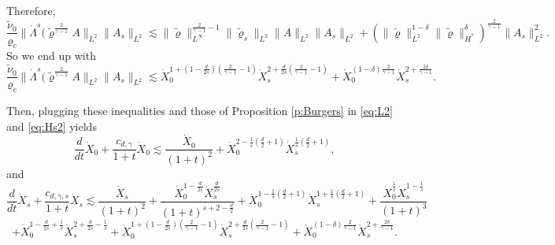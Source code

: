 \documentclass[11pt,twoside]{amsart}
\newcommand{\tildrho}{\tilde{\varrho}}
\begin{document}
Therefore,
$$
\frac{\tilde \nu_0}{\varrho_c}\|\dot\Lambda^s(\tildrho^{\frac{2}{\gamma-1}} A\|_{L^2}\|A_s\|_{L^2}
\lesssim
\|\tildrho\|_{L^\infty}^{\frac{2}{\gamma-1}-1} \|\tildrho_s\|_{L^2}
\|A\|_{L^2}\|A_s\|_{L^2}
+\left( \|\tildrho\|_{L^2}^{1-\delta}\| \tildrho \|_{\dot H^s}^{\delta}
\right)^{\frac{2}{\gamma-1}}
\|A_s\|_{L^2}^2.
$$
So we end up  with
$$
\frac{\tilde \nu_0}{\varrho_c}\|\dot\Lambda^s(\tildrho^{\frac{2}{\gamma-1}} A\|_{L^2}\|A_s\|_{L^2}
\lesssim
\dot X_0^{1+(1-\frac{d}{2s})(\frac{2}{\gamma-1}-1)}
\dot X_s^{2+\frac{d}{2s}(\frac{2}{\gamma-1}-1)}
+
\dot X_0^{(1-\delta)\frac{2}{\gamma-1}}
\dot X_s^{2+\frac{2\delta}{\gamma-1}}.
$$

Then, plugging these inequalities and those of Proposition \ref{p:Burgers} in \eqref{eq:L2} and \eqref{eq:Hs2} yields
$$
\frac d{dt}\dot X_0+\frac{c_{d,\gamma}}{1+t}\dot X_0\lesssim \frac{\dot X_0}{(1+t)^2}+\dot X_0^{2-\frac1s(\frac d2+1)}\dot X_s^{\frac1s(\frac d2+1)},
$$
and
$$
\frac d{dt}\dot X_s+\frac{c_{d,\gamma,s}}{1+t}\dot X_s\lesssim \frac{\dot X_s}{(1+t)^2}+\frac{\dot X_0^{1-\frac d{2s}}\dot X_s^{\frac d{2s}}}{(1+t)^{s+2-\frac d2}}
+\dot X_0^{1-\frac 1s(\frac d2+1)}\dot X_s^{1+\frac1s(\frac d2+1)}+\frac{\dot X_0^{\frac1s}\dot X_s^{1-\frac1s}}{(1+t)^3}
$$
$$
+\dot X_0^{1-\frac{d}{2s}+\frac{1}{s}}
\dot X_s^{2+\frac{d}{2s}-\frac{1}{s}}
+
\dot X_0^{1+(1-\frac{d}{2s})(\frac{2}{\gamma-1}-1)}
\dot X_s^{2+\frac{d}{2s}(\frac{2}{\gamma-1}-1)}
+
\dot X_0^{(1-\delta)\frac{2}{\gamma-1}}
\dot X_s^{2+\frac{2\delta}{\gamma-1}}.
$$
\end{document}
